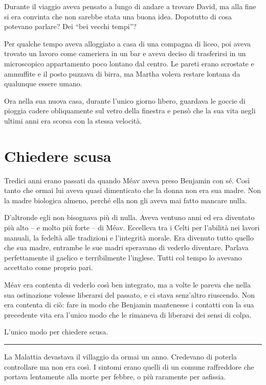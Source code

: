 \documentclass[a4paper,10pt]{memoir}
\begin{document}
Durante il viaggio aveva pensato a lungo di andare a trovare David, ma alla fine si era convinta che non sarebbe stata
una buona idea. Dopotutto di cosa potevano parlare? Dei ``bei vecchi tempi''?

Per qualche tempo aveva alloggiato a casa di una compagna di liceo, poi aveva trovato un lavoro come cameriera in un bar
e aveva deciso di trasferirsi in un microscopico appartamento poco lontano dal centro. Le pareti erano scrostate e
ammuffite e il posto puzzava di birra, ma Martha voleva restare lontana da qualunque essere umano.

Ora nella sua nuova casa, durante l'unico giorno libero, guardava le goccie di pioggia cadere obliquamente sul vetro
della finestra e pensò che la sua vita negli ultimi anni era scorsa con la stessa velocità.

\chapter{Chiedere scusa}

Tredici anni erano passati da quando Méav aveva preso Benjamin con sé. Così tanto che ormai lui aveva quasi dimenticato
che la donna non era sua madre. Non la madre biologica almeno, perché ella non gli aveva mai fatto mancare nulla.

D'altronde egli non bisognava più di nulla. Aveva ventuno anni ed era diventato più alto -- e molto più forte -- di
Méav. Eccelleva tra i Celti per l'abilità nei lavori manuali, la fedeltà alle tradizioni e l'integrità morale. Era
divenuto tutto quello che sua madre, entrambe le sue madri speravano di vederlo diventare. Parlava perfettamente il
gaelico e terribilmente l'inglese. Tutti col tempo lo avevano accettato come proprio pari.

Méav era contenta di vederlo così ben integrato, ma a volte le pareva che nella sua ostinazione volesse liberarsi del
passato, e ci stava senz'altro riuscendo. Non era contenta di ciò: fare in modo che Benjamin mantenesse i contatti con
la sua precedente vita era l'unico modo che le rimaneva di liberarsi dei sensi di colpa.

L'unico modo per chiedere scusa.

\plainbreak{1}

La Malattia devastava il villaggio da ormai un anno. Credevano di poterla controllare ma non era così. I sintomi erano
quelli di un comune raffreddore che portava lentamente alla morte per febbre, o più raramente per asfissia.
\end{document}
